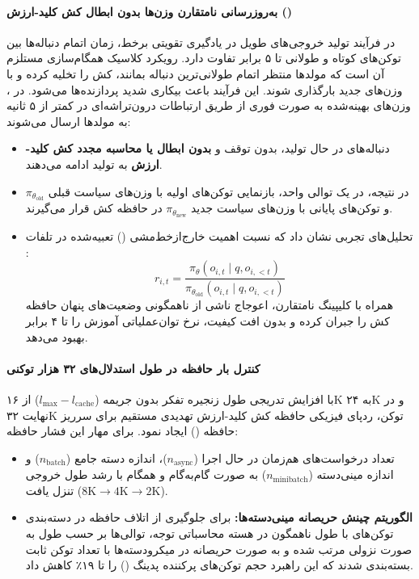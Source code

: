 \paragraph*{به‌روزرسانی نامتقارن وزن‌ها بدون ابطال کش کلید-ارزش ()}
در فرآیند تولید خروجی‌های طویل در یادگیری تقویتی برخط، زمان اتمام دنباله‌ها بین توکن‌های کوتاه و طولانی تا ۵ برابر تفاوت دارد. رویکرد کلاسیک همگام‌سازی مستلزم آن است که مولدها منتظر اتمام طولانی‌ترین دنباله بمانند، کش  را تخلیه کرده و با وزن‌های جدید بارگذاری شوند. این فرآیند باعث بیکاری شدید پردازنده‌ها می‌شود.
در ، وزن‌های بهینه‌شده به صورت فوری از طریق ارتباطات درون‌تراشه‌ای  در کمتر از ۵ ثانیه به مولدها ارسال می‌شوند:
\begin{itemize}
    \item دنباله‌های در حال تولید، بدون توقف و \textbf{بدون ابطال یا محاسبه مجدد کش کلید-ارزش} به تولید ادامه می‌دهند.
    \item در نتیجه، در یک توالی واحد، بازنمایی توکن‌های اولیه با وزن‌های سیاست قبلی $\pi_{\theta_{\text{old}}}$ و توکن‌های پایانی با وزن‌های سیاست جدید $\pi_{\theta_{\text{new}}}$ در حافظه کش قرار می‌گیرند.
    \item تحلیل‌های تجربی نشان داد که نسبت اهمیت خارج‌از‌خط‌مشی () تعبیه‌شده در تلفات :
    \begin{equation}
        r_{i,t} = \frac{\pi_\theta(o_{i,t} \mid q, o_{i,<t})}{\pi_{\theta_{\text{old}}}(o_{i,t} \mid q, o_{i,<t})}
    \end{equation}
    همراه با کلیپینگ نامتقارن، اعوجاج ناشی از ناهمگونی وضعیت‌های پنهان حافظه کش را جبران کرده و بدون افت کیفیت، نرخ توان‌عملیاتی آموزش را تا ۴ برابر بهبود می‌دهد.
\end{itemize}

\paragraph*{کنترل بار حافظه  در طول استدلال‌های ۳۲ هزار توکنی}
با افزایش تدریجی طول زنجیره تفکر بدون جریمه ($l_{\text{max}} - l_{\text{cache}}$) از ۱۶K به ۲۴K و در نهایت ۳۲K توکن، ردپای فیزیکی حافظه کش کلید-ارزش تهدیدی مستقیم برای سرریز حافظه () ایجاد نمود. برای مهار این فشار حافظه:
\begin{itemize}
    \item تعداد درخواست‌های هم‌زمان در حال اجرا ($n_{\text{async}}$)، اندازه دسته جامع ($n_{\text{batch}}$) و اندازه مینی‌دسته ($n_{\text{minibatch}}$) به صورت گام‌به‌گام و همگام با رشد طول خروجی تنزل یافت ($8\text{K} \to 4\text{K} \to 2\text{K}$).
    \item \textbf{الگوریتم چینش حریصانه مینی‌دسته‌ها:} برای جلوگیری از اتلاف حافظه در دسته‌بندی توکن‌های با طول ناهمگون در هسته محاسباتی توجه، توالی‌ها بر حسب طول به صورت نزولی مرتب شده و به صورت حریصانه در میکرودسته‌ها با تعداد توکن ثابت بسته‌بندی شدند که این راهبرد حجم توکن‌های پرکننده پدینگ () را تا ۱۹٪ کاهش داد.
\end{itemize}